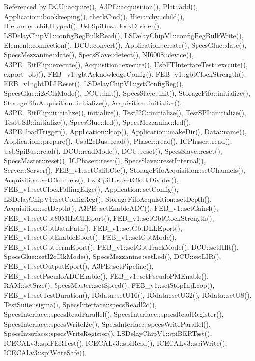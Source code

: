 Referenced by D\+C\+U\+::acquire(), A3\+P\+E\+::acquisition(), Plot\+::add(), Application\+::bookkeeping(), check\+Cmd(), Hierarchy\+::child(), Hierarchy\+::child\+Typed(), Usb\+Spi\+Bus\+::clock\+Divider(), L\+S\+Delay\+Chip\+V1\+::config\+Reg\+Bulk\+Read(), L\+S\+Delay\+Chip\+V1\+::config\+Reg\+Bulk\+Write(), Element\+::connection(), D\+C\+U\+::convert(), Application\+::create(), Specs\+Glue\+::date(), Specs\+Mezzanine\+::date(), Specs\+Slave\+::detect(), N\+I6008\+::device(), A3\+P\+E\+\_\+\+Bit\+Flip\+::execute(), Acquisition\+::execute(), Usb\+F\+T\+Interface\+Test\+::execute(), export\+\_\+obj(), F\+E\+B\+\_\+v1\+::gbt\+Acknowledge\+Config(), F\+E\+B\+\_\+v1\+::gbt\+Clock\+Strength(), F\+E\+B\+\_\+v1\+::gbt\+D\+L\+L\+Reset(), L\+S\+Delay\+Chip\+V1\+::get\+Config\+Reg(), Specs\+Glue\+::i2c\+Clk\+Mode(), D\+C\+U\+::init(), Specs\+Slave\+::init(), Storage\+Fifo\+::initialize(), Storage\+Fifo\+Acquisition\+::initialize(), Acquisition\+::initialize(), A3\+P\+E\+\_\+\+Bit\+Flip\+::initialize(), initialize(), Test\+I2\+C\+::initialize(), Test\+S\+P\+I\+::initialize(), Test\+U\+S\+B\+::initialize(), Specs\+Glue\+::led(), Specs\+Mezzanine\+::led(), A3\+P\+E\+::load\+Trigger(), Application\+::loop(), Application\+::make\+Dir(), Data\+::name(), Application\+::prepare(), Usb\+I2c\+Bus\+::read(), Phaser\+::read(), I\+C\+Phaser\+::read(), Usb\+Spi\+Bus\+::read(), D\+C\+U\+::read\+Mode(), D\+C\+U\+::reset(), Specs\+Slave\+::reset(), Specs\+Master\+::reset(), I\+C\+Phaser\+::reset(), Specs\+Slave\+::reset\+Internal(), Server\+::\+Server(), F\+E\+B\+\_\+v1\+::set\+Calib\+Cte(), Storage\+Fifo\+Acquisition\+::set\+Channels(), Acquisition\+::set\+Channels(), Usb\+Spi\+Bus\+::set\+Clock\+Divider(), F\+E\+B\+\_\+v1\+::set\+Clock\+Falling\+Edge(), Application\+::set\+Config(), L\+S\+Delay\+Chip\+V1\+::set\+Config\+Reg(), Storage\+Fifo\+Acquisition\+::set\+Depth(), Acquisition\+::set\+Depth(), A3\+P\+E\+::set\+Enable\+A\+D\+C(), F\+E\+B\+\_\+v1\+::set\+Gain4(), F\+E\+B\+\_\+v1\+::set\+Gbt80\+M\+Hz\+Clk\+Eport(), F\+E\+B\+\_\+v1\+::set\+Gbt\+Clock\+Strength(), F\+E\+B\+\_\+v1\+::set\+Gbt\+Data\+Path(), F\+E\+B\+\_\+v1\+::set\+Gbt\+D\+L\+L\+Eport(), F\+E\+B\+\_\+v1\+::set\+Gbt\+Enable\+Eport(), F\+E\+B\+\_\+v1\+::set\+Gbt\+Mode(), F\+E\+B\+\_\+v1\+::set\+Gbt\+Term\+Eport(), F\+E\+B\+\_\+v1\+::set\+Gbt\+Track\+Mode(), D\+C\+U\+::set\+H\+I\+R(), Specs\+Glue\+::set\+I2c\+Clk\+Mode(), Specs\+Mezzanine\+::set\+Led(), D\+C\+U\+::set\+L\+I\+R(), F\+E\+B\+\_\+v1\+::set\+Output\+Eport(), A3\+P\+E\+::set\+Pipeline(), F\+E\+B\+\_\+v1\+::set\+Pseudo\+A\+D\+C\+Enable(), F\+E\+B\+\_\+v1\+::set\+Pseudo\+P\+M\+Enable(), R\+A\+M\+::set\+Size(), Specs\+Master\+::set\+Speed(), F\+E\+B\+\_\+v1\+::set\+Stop\+Inj\+Loop(), F\+E\+B\+\_\+v1\+::set\+Test\+Duration(), I\+Odata\+::set\+U16(), I\+Odata\+::set\+U32(), I\+Odata\+::set\+U8(), Test\+Suite\+::sigma(), Specs\+Interface\+::specs\+Read\+I2c(), Specs\+Interface\+::specs\+Read\+Parallel(), Specs\+Interface\+::specs\+Read\+Register(), Specs\+Interface\+::specs\+Write\+I2c(), Specs\+Interface\+::specs\+Write\+Parallel(), Specs\+Interface\+::specs\+Write\+Register(), L\+S\+Delay\+Chip\+V1\+::spi\+B\+E\+R\+Test(), I\+C\+E\+C\+A\+Lv3\+::spi\+F\+E\+R\+Test(), I\+C\+E\+C\+A\+Lv3\+::spi\+Read(), I\+C\+E\+C\+A\+Lv3\+::spi\+Write(), I\+C\+E\+C\+A\+Lv3\+::spi\+Write\+Safe(), 
